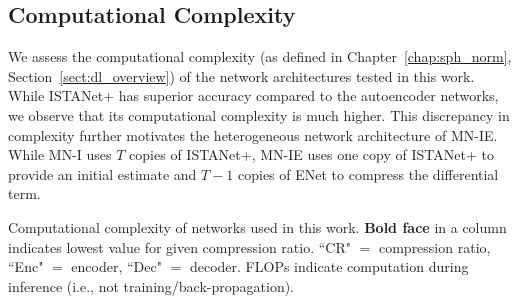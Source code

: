 \subsection{Computational Complexity}

We assess the computational complexity (as defined in Chapter~\ref{chap:sph_norm}, Section~\ref{sect:dl_overview}) of the network architectures tested in this work. While ISTANet+ has superior accuracy compared to the autoencoder networks, we observe that its computational complexity is much higher. This discrepancy in complexity further motivates the heterogeneous network architecture of MN-IE. While MN-I uses $T$ copies of ISTANet+, MN-IE uses one copy of ISTANet+ to provide an initial estimate and $T-1$ copies of ENet to compress the differential term.

\begin{table}[htb]
\centering
\caption{Computational complexity of networks used in this work. \textbf{Bold face} in a column indicates lowest value for given compression ratio. ``CR" $=$ compression ratio, ``Enc" $=$ encoder, ``Dec" $=$ decoder. FLOPs indicate computation during inference (i.e., not training/back-propagation).}
\label{tab:net-complexity} 


\end{table}
